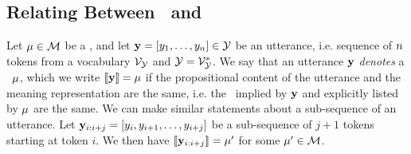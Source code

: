 \subsection{Relating Between \MeaningRepresentations~and \Utterances}

Let $\mu \in \mathcal{M}$ be a \meaningrepresentation, and let $\mathbf{y} = \left[y_1,\ldots,
y_n \right] \in \mathcal{Y}$ be an utterance, i.e. sequence of $n$ tokens from a vocabulary 
$\mathcal{V}_{\mathcal{Y}}$ and $\mathcal{Y} = \mathcal{V}_{\mathcal{Y}}^*$. We say that an utterance $\mathbf{y}$ \textit{denotes} a \meaningrepresentation~$\mu$,
which we write $\left\llbracket \mathbf{y} \right\rrbracket = \mu$ if the propositional content of the utterance and the
meaning representation are the same, i.e. the \attributevalues~implied by $\mathbf{y}$ and explicitly 
listed by $\mu$ are the same. 
We can make similar statements about a sub-sequence of an utterance. Let 
$\mathbf{y}_{i:i+j} = \left[y_i, y_{i+1},\ldots, y_{i+j} \right]$ 
be a
sub-sequence of $j+1$ tokens starting at token $i$. 
We then have $\left\llbracket \mathbf{y}_{i:i+j} \right\rrbracket = \mu^\prime$ for some $\mu^\prime \in \mathcal{M}$.  


